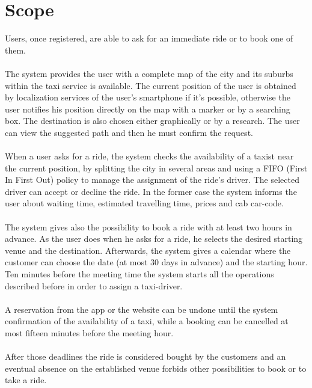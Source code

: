 \section{Scope}
Users, once registered, are able to ask for an immediate ride or to book one of them.\\
\\
The system provides the user with a complete map of the city and its suburbs within the taxi service is available. The current position of the user is obtained by localization services of the user's smartphone if it's possible, otherwise the user notifies his position directly on the map with a marker or by a searching box. The destination is also chosen either graphically or by a research. The user can view the suggested path and then he must confirm the request.\\
\\
When a user asks for a ride, the system checks the availability of a taxist near the current position, by splitting the city in several areas and using a FIFO (First In First Out) policy to manage the assignment of the ride's driver. The selected driver can accept or decline the ride. In the former case the system informs the user about waiting time, estimated travelling time, prices and cab car-code. \\
\\
The system gives also the possibility to book a ride with at least two hours in advance. As the user does when he asks for a ride, he selects the desired starting venue and the destination. Afterwards, the system gives a calendar where the customer can choose the date (at most 30 days in advance) and the starting hour. Ten minutes before the meeting time the system starts all the operations described before in order to assign a taxi-driver.\\
\\
A reservation from the app or the website can be undone until the system confirmation of the availability of a taxi, while a booking can be cancelled at most fifteen minutes before the meeting hour.\\
\\
After those deadlines the ride is considered bought by the customers and an eventual absence on the established venue forbids other possibilities to book or to take a ride.


